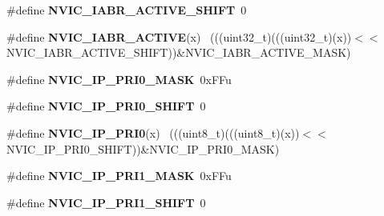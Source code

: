 \begin{DoxyCompactItemize}
\item 
\hypertarget{group___n_v_i_c___register___masks_gac8dcfe7e4f395144b0e6e76762ee7ec5}{}\#define {\bfseries N\+V\+I\+C\+\_\+\+I\+A\+B\+R\+\_\+\+A\+C\+T\+I\+V\+E\+\_\+\+S\+H\+I\+F\+T}~0\label{group___n_v_i_c___register___masks_gac8dcfe7e4f395144b0e6e76762ee7ec5}

\item 
\hypertarget{group___n_v_i_c___register___masks_ga5f7fd0d76d8c5ad89ee6663aa010e74d}{}\#define {\bfseries N\+V\+I\+C\+\_\+\+I\+A\+B\+R\+\_\+\+A\+C\+T\+I\+V\+E}(x)                                        ~(((uint32\+\_\+t)(((uint32\+\_\+t)(x))$<$$<$N\+V\+I\+C\+\_\+\+I\+A\+B\+R\+\_\+\+A\+C\+T\+I\+V\+E\+\_\+\+S\+H\+I\+F\+T))\&N\+V\+I\+C\+\_\+\+I\+A\+B\+R\+\_\+\+A\+C\+T\+I\+V\+E\+\_\+\+M\+A\+S\+K)\label{group___n_v_i_c___register___masks_ga5f7fd0d76d8c5ad89ee6663aa010e74d}

\item 
\hypertarget{group___n_v_i_c___register___masks_ga3dc0f7581dace9e268dedeb54e4d2d48}{}\#define {\bfseries N\+V\+I\+C\+\_\+\+I\+P\+\_\+\+P\+R\+I0\+\_\+\+M\+A\+S\+K}~0x\+F\+Fu\label{group___n_v_i_c___register___masks_ga3dc0f7581dace9e268dedeb54e4d2d48}

\item 
\hypertarget{group___n_v_i_c___register___masks_gace60574829a4c50fdb97f48a9f2c510e}{}\#define {\bfseries N\+V\+I\+C\+\_\+\+I\+P\+\_\+\+P\+R\+I0\+\_\+\+S\+H\+I\+F\+T}~0\label{group___n_v_i_c___register___masks_gace60574829a4c50fdb97f48a9f2c510e}

\item 
\hypertarget{group___n_v_i_c___register___masks_ga8795fff1780f9124da8ccec7f920452c}{}\#define {\bfseries N\+V\+I\+C\+\_\+\+I\+P\+\_\+\+P\+R\+I0}(x)                                                ~(((uint8\+\_\+t)(((uint8\+\_\+t)(x))$<$$<$N\+V\+I\+C\+\_\+\+I\+P\+\_\+\+P\+R\+I0\+\_\+\+S\+H\+I\+F\+T))\&N\+V\+I\+C\+\_\+\+I\+P\+\_\+\+P\+R\+I0\+\_\+\+M\+A\+S\+K)\label{group___n_v_i_c___register___masks_ga8795fff1780f9124da8ccec7f920452c}

\item 
\hypertarget{group___n_v_i_c___register___masks_ga181c4641dc78254d7358a4effa0d1d4f}{}\#define {\bfseries N\+V\+I\+C\+\_\+\+I\+P\+\_\+\+P\+R\+I1\+\_\+\+M\+A\+S\+K}~0x\+F\+Fu\label{group___n_v_i_c___register___masks_ga181c4641dc78254d7358a4effa0d1d4f}

\item 
\hypertarget{group___n_v_i_c___register___masks_ga853fbb1bf63b13c38ac2e18f9f73b721}{}\#define {\bfseries N\+V\+I\+C\+\_\+\+I\+P\+\_\+\+P\+R\+I1\+\_\+\+S\+H\+I\+F\+T}~0\label{group___n_v_i_c___register___masks_ga853fbb1bf63b13c38ac2e18f9f73b721}


\end{DoxyCompactItemize}

